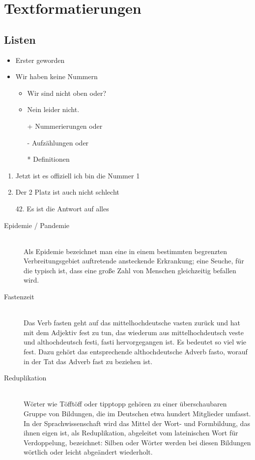 \chapter{Textformatierungen}

\section{Listen}
\begin{itemize}
	\item Erster geworden
	\item Wir haben keine Nummern
	\begin{itemize}
		\item Wir sind nicht oben oder?
		\item Nein leider nicht.
		\item[+] Nummerierungen oder
		\item[-] Aufzählungen oder
		\item[*] Definitionen 
	\end{itemize}
\end{itemize}

\begin{enumerate}
	\item Jetzt ist es offiziell ich bin die Nummer 1
	\item Der 2 Platz ist auch nicht schlecht
	\item[42.] Es ist die Antwort auf alles
\end{enumerate}

\begin{description}
	\item[Epidemie / Pandemie] \hfill \\
	Als Epidemie bezeichnet man eine in einem bestimmten begrenzten Verbreitungsgebiet auftretende ansteckende Erkrankung; eine Seuche, für die typisch ist, dass eine große Zahl von Menschen gleichzeitig befallen wird. 
	\item[Fastenzeit] \hfill \\
	Das Verb fasten geht auf das mittelhochdeutsche vasten zurück und hat mit dem Adjektiv fest zu tun, das wiederum aus mittelhochdeutsch veste und althochdeutsch festi, fasti hervorgegangen ist. Es bedeutet so viel wie fest. Dazu gehört das entsprechende althochdeutsche Adverb fasto, worauf in der Tat das Adverb fast zu beziehen ist.
	\item[Reduplikation] \hfill \\
	Wörter wie Töfftöff oder tipptopp gehören zu einer überschaubaren Gruppe von Bildungen, die im Deutschen etwa hundert Mitglieder umfasst. In der Sprachwissenschaft wird das Mittel der Wort- und Formbildung, das ihnen eigen ist, als Reduplikation, abgeleitet vom lateinischen Wort für Verdoppelung, bezeichnet: Silben oder Wörter werden bei diesen Bildungen wörtlich oder leicht abgeändert wiederholt.
\end{description}


